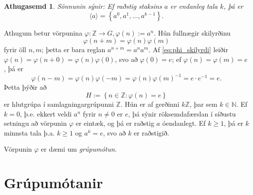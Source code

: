 \documentclass[a4paper,icelandic,11pt]{book}
\theoremstyle{plain}
\newtheorem*{ath}{Athugasemd}
\newcommand{\N}{\mathbb{N}}
\newcommand{\Z}{\mathbb{Z}}
\begin{document}
\begin{ath}
  Sönnunin sýnir: Ef raðstig staksins $a$ er endanleg tala $k$, þá er\[
  \langle a \rangle = \left\{ a^0, a^1, \dots, a^{k-1} \right\}.
  \]
\end{ath}

Athugum betur vörpunina $\varphi:\Z\to G, \varphi(n) := a^n$. Hún fullnægir
skilyrðinu
\begin{equation}
  \varphi(n+m) = \varphi(n)\varphi(m)
  \label{eq:phi_skilyrdi}
\end{equation}
fyrir öll $n,m$; þetta er bara reglan $a^{n+m} = a^n a^m$. Af
\eqref{eq:phi_skilyrdi} leiðir $\varphi(n)=\varphi(n+0) =
\varphi(n)\varphi(0)$, svo að $\varphi(0) = e$; ef
$\varphi(n)=\varphi(m) = e$, þá er\[
\varphi(n-m) = \varphi(n)\varphi(-m) = \varphi(n)\varphi(m)^{-1} = e\cdot
e^{-1} = e.
\]
 Þetta þýðir að 
\[
H:= \left\{ n\in \Z: \varphi(n)=e \right\}
\]
er hlutgrúpa í samlagningargrúpunni $\Z$. Hún er af gerðinni $k\Z$, þar sem
$k\in \N$. Ef $k=0$, þ.e. ekkert veldi $a^n$ fyrir $n\neq 0$ er $e$, þá sýnir
röksemdafærslan í síðustu setningu að vörpunin $\varphi$ er eintæk, og þá er
raðstig $a$ óendanlegt. Ef $k\ge 1$, þá er $k$ minnsta tala þ.a. $k\ge 1$ og
$a^k = e$, svo að $k$ er raðstigið.

Vörpunin $\varphi$ er dæmi um \emph{grúpumótun}.

\chapter{Grúpumótanir}
\end{document}
